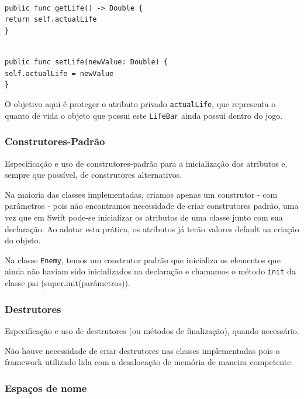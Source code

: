 \documentclass[rel_mlp]{iiufrgs}
\newcommand\tab[1][1cm]{\hspace*{#1}}
\begin{document}
\texttt{\\public func getLife() -> Double \{\\\tab return self.actualLife\\\}}

\texttt{\\public func setLife(newValue: Double) \{\\\tab self.actualLife = newValue\\\}}
    
O objetivo aqui é proteger o atributo privado \texttt{actualLife}, que representa o quanto de vida o objeto que possui este \texttt{LifeBar} ainda possui dentro do jogo.


\subsubsection{Construtores-Padrão}

Especificação e uso de construtores-padrão para a inicialização dos atributos e, sempre que possível, de construtores alternativos.

Na maioria das classes implementadas, criamos apenas um construtor - com parâmetros - pois não encontramos necessidade de criar construtores padrão, uma vez que em Swift pode-se inicializar os atributos de uma classe junto com sua declaração. Ao adotar esta prática, os atributos já terão valores default na criação do objeto.

Na classe \texttt{Enemy}, temos um construtor padrão que inicializa os elementos que ainda não haviam sido inicializados na declaração e chamamos o método \texttt{init} da classe pai (super.init(parâmetros)).


\subsubsection{Destrutores}

Especificação e uso de destrutores (ou métodos de finalização), quando necessário.

Não houve necessidade de criar destrutores nas classes implementadas pois o framework utilizado lida com a desalocação de memória de maneira competente.


\subsubsection{Espaços de nome}
\end{document}
